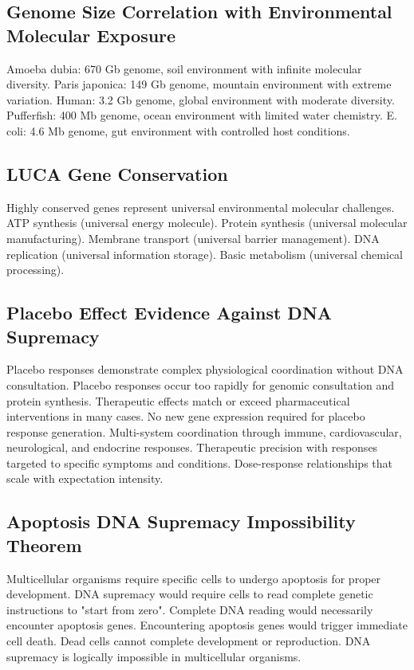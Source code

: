 \documentclass[12pt,a4paper]{article}
\begin{document}
\subsection{Genome Size Correlation with Environmental Molecular Exposure}

Amoeba dubia: 670 Gb genome, soil environment with infinite molecular diversity. Paris japonica: 149 Gb genome, mountain environment with extreme variation. Human: 3.2 Gb genome, global environment with moderate diversity. Pufferfish: 400 Mb genome, ocean environment with limited water chemistry. E. coli: 4.6 Mb genome, gut environment with controlled host conditions.

\subsection{LUCA Gene Conservation}

Highly conserved genes represent universal environmental molecular challenges. ATP synthesis (universal energy molecule). Protein synthesis (universal molecular manufacturing). Membrane transport (universal barrier management). DNA replication (universal information storage). Basic metabolism (universal chemical processing).

\subsection{Placebo Effect Evidence Against DNA Supremacy}

Placebo responses demonstrate complex physiological coordination without DNA consultation. Placebo responses occur too rapidly for genomic consultation and protein synthesis. Therapeutic effects match or exceed pharmaceutical interventions in many cases. No new gene expression required for placebo response generation. Multi-system coordination through immune, cardiovascular, neurological, and endocrine responses. Therapeutic precision with responses targeted to specific symptoms and conditions. Dose-response relationships that scale with expectation intensity.

\subsection{Apoptosis DNA Supremacy Impossibility Theorem}

Multicellular organisms require specific cells to undergo apoptosis for proper development. DNA supremacy would require cells to read complete genetic instructions to "start from zero". Complete DNA reading would necessarily encounter apoptosis genes. Encountering apoptosis genes would trigger immediate cell death. Dead cells cannot complete development or reproduction. DNA supremacy is logically impossible in multicellular organisms.
\end{document}
